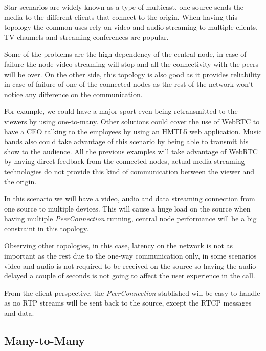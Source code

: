 Star scenarios are widely known as a type of multicast, one source sends the media to the different clients that connect to the origin. When having this topology the common uses rely on video and audio streaming to multiple clients, TV channels and streaming conferences are popular.

Some of the problems are the high dependency of the central node, in case of failure the node video streaming will stop and all the connectivity with the peers will be over. On the other side, this topology is also good as it provides reliability in case of failure of one of the connected nodes as the rest of the network won't notice any difference on the communication. 

For example, we could have a major sport even being retransmitted to the viewers by using one-to-many. Other solutions could cover the use of WebRTC to have a CEO talking to the employees by using an HMTL5 web application. Music bands also could take advantage of this scenario by being able to transmit his show to the audience. All the previous examples will take advantage of WebRTC by having direct feedback from the connected nodes, actual media streaming technologies do not provide this kind of communication between the viewer and the origin.

In this scenario we will have a video, audio and data streaming connection from one source to multiple devices. This will cause a huge load on the source when having multiple {\it PeerConnection} running, central node performance will be a big constraint in this topology. 

Observing other topologies, in this case, latency on the network is not as important as the rest due to the one-way communication only, in some scenarios video and audio is not required to be received on the source so having the audio delayed a couple of seconds is not going to affect the user experience in the call.

From the client perspective, the {\it PeerConnection} stablished will be easy to handle as no RTP streams will be sent back to the source, except the RTCP messages and data.

\subsection{Many-to-Many}

